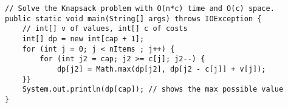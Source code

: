 \begin{verbatim}
// Solve the Knapsack problem with O(n*c) time and O(c) space.
public static void main(String[] args) throws IOException {
	// int[] v of values, int[] c of costs
	int[] dp = new int[cap + 1];
	for (int j = 0; j < nItems ; j++) {
		for (int j2 = cap; j2 >= c[j]; j2--) {
			dp[j2] = Math.max(dp[j2], dp[j2 - c[j]] + v[j]);
	}}
	System.out.println(dp[cap]); // shows the max possible value
}
\end{verbatim}